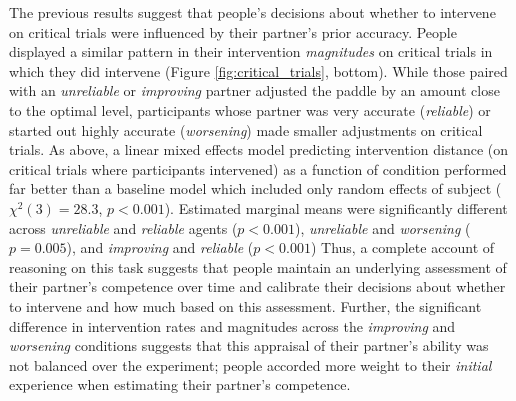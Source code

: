 \documentclass[10pt,letterpaper]{article}
\begin{document}
The previous results suggest that people's decisions about whether to intervene on critical trials were influenced by their partner's prior accuracy. People displayed a similar pattern in their intervention \textit{magnitudes} on critical trials in which they did intervene (Figure \ref{fig:critical_trials}, bottom). While those paired with an \textit{unreliable} or \textit{improving} partner adjusted the paddle by an amount close to the optimal level, participants whose partner was very accurate (\textit{reliable}) or started out highly accurate (\textit{worsening}) made smaller adjustments on critical trials. As above, a linear mixed effects model predicting intervention distance (on critical trials where participants intervened) as a function of condition performed far better than a baseline model which included only random effects of subject ($\chi^2(3) = 28.3$, $p < 0.001$). Estimated marginal means were significantly different across \textit{unreliable} and \textit{reliable} agents ($p < 0.001$), \textit{unreliable} and \textit{worsening} ($p = 0.005$), and \textit{improving} and \textit{reliable} ($p < 0.001$) Thus, a complete account of reasoning on this task suggests that people maintain an underlying assessment of their partner's competence over time and calibrate their decisions about whether to intervene and how much based on this assessment. Further, the significant difference in intervention rates and magnitudes across the \textit{improving} and \textit{worsening} conditions suggests that this appraisal of their partner's ability was not balanced over the experiment; people accorded more weight to their \textit{initial} experience when estimating their partner's competence.
\end{document}
